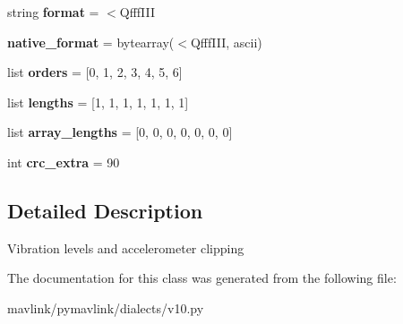 \begin{DoxyCompactItemize}
string {\bfseries format} = \textquotesingle{}$<$Qfff\+I\+II\textquotesingle{}
\item 
\mbox{\label{classpymavlink_1_1dialects_1_1v10_1_1MAVLink__vibration__message_acdcec0c6ad9989d1c1669fc99aa3feab}} 
{\bfseries native\+\_\+format} = bytearray(\textquotesingle{}$<$Qfff\+I\+II\textquotesingle{}, \textquotesingle{}ascii\textquotesingle{})
\item 
\mbox{\label{classpymavlink_1_1dialects_1_1v10_1_1MAVLink__vibration__message_ae9bdccd126a2ddc1b4c24893925ace4c}} 
list {\bfseries orders} = \mbox{[}0, 1, 2, 3, 4, 5, 6\mbox{]}
\item 
\mbox{\label{classpymavlink_1_1dialects_1_1v10_1_1MAVLink__vibration__message_afc3240b1ef088ae51909fee0dd880eb3}} 
list {\bfseries lengths} = \mbox{[}1, 1, 1, 1, 1, 1, 1\mbox{]}
\item 
\mbox{\label{classpymavlink_1_1dialects_1_1v10_1_1MAVLink__vibration__message_adfe03dedc5ccad0824fe41086a2cceb9}} 
list {\bfseries array\+\_\+lengths} = \mbox{[}0, 0, 0, 0, 0, 0, 0\mbox{]}
\item 
\mbox{\label{classpymavlink_1_1dialects_1_1v10_1_1MAVLink__vibration__message_aba05412b9bb25668ef1aaf826ee8e96f}} 
int {\bfseries crc\+\_\+extra} = 90
\end{DoxyCompactItemize}


\subsection{Detailed Description}
\begin{DoxyVerb}Vibration levels and accelerometer clipping
\end{DoxyVerb}
 

The documentation for this class was generated from the following file\+:\begin{DoxyCompactItemize}
\item 
mavlink/pymavlink/dialects/v10.\+py\end{DoxyCompactItemize}
